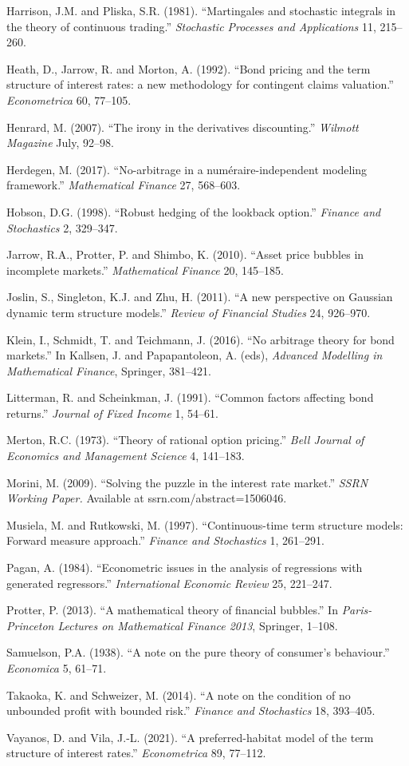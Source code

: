 \documentclass[
]{article}
\begin{document}
Harrison, J.M. and Pliska, S.R. (1981). ``Martingales and stochastic
integrals in the theory of continuous trading.'' \emph{Stochastic
Processes and Applications} 11, 215--260.

Heath, D., Jarrow, R. and Morton, A. (1992). ``Bond pricing and the term
structure of interest rates: a new methodology for contingent claims
valuation.'' \emph{Econometrica} 60, 77--105.

Henrard, M. (2007). ``The irony in the derivatives discounting.''
\emph{Wilmott Magazine} July, 92--98.

Herdegen, M. (2017). ``No-arbitrage in a numéraire-independent modeling
framework.'' \emph{Mathematical Finance} 27, 568--603.

Hobson, D.G. (1998). ``Robust hedging of the lookback option.''
\emph{Finance and Stochastics} 2, 329--347.

Jarrow, R.A., Protter, P. and Shimbo, K. (2010). ``Asset price bubbles
in incomplete markets.'' \emph{Mathematical Finance} 20, 145--185.

Joslin, S., Singleton, K.J. and Zhu, H. (2011). ``A new perspective on
Gaussian dynamic term structure models.'' \emph{Review of Financial
Studies} 24, 926--970.

Klein, I., Schmidt, T. and Teichmann, J. (2016). ``No arbitrage theory
for bond markets.'' In Kallsen, J. and Papapantoleon, A. (eds),
\emph{Advanced Modelling in Mathematical Finance}, Springer, 381--421.

Litterman, R. and Scheinkman, J. (1991). ``Common factors affecting bond
returns.'' \emph{Journal of Fixed Income} 1, 54--61.

Merton, R.C. (1973). ``Theory of rational option pricing.'' \emph{Bell
Journal of Economics and Management Science} 4, 141--183.

Morini, M. (2009). ``Solving the puzzle in the interest rate market.''
\emph{SSRN Working Paper.} Available at ssrn.com/abstract=1506046.

Musiela, M. and Rutkowski, M. (1997). ``Continuous-time term structure
models: Forward measure approach.'' \emph{Finance and Stochastics} 1,
261--291.

Pagan, A. (1984). ``Econometric issues in the analysis of regressions
with generated regressors.'' \emph{International Economic Review} 25,
221--247.

Protter, P. (2013). ``A mathematical theory of financial bubbles.'' In
\emph{Paris-Princeton Lectures on Mathematical Finance 2013}, Springer,
1--108.

Samuelson, P.A. (1938). ``A note on the pure theory of consumer's
behaviour.'' \emph{Economica} 5, 61--71.

Takaoka, K. and Schweizer, M. (2014). ``A note on the condition of no
unbounded profit with bounded risk.'' \emph{Finance and Stochastics} 18,
393--405.

Vayanos, D. and Vila, J.-L. (2021). ``A preferred-habitat model of the
term structure of interest rates.'' \emph{Econometrica} 89, 77--112.
\end{document}
